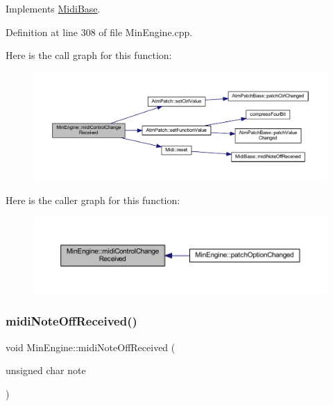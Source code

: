 Implements \hyperlink{class_midi_base_a8364d72d525fd8a766a124ca3230a4c7}{Midi\+Base}.



Definition at line 308 of file Min\+Engine.\+cpp.

Here is the call graph for this function\+:
\nopagebreak
\begin{figure}[H]
\begin{center}
\leavevmode
\includegraphics[width=350pt]{class_min_engine_ad7404def0db3926e77c8828cab13cca9_cgraph}
\end{center}
\end{figure}
Here is the caller graph for this function\+:
\nopagebreak
\begin{figure}[H]
\begin{center}
\leavevmode
\includegraphics[width=350pt]{class_min_engine_ad7404def0db3926e77c8828cab13cca9_icgraph}
\end{center}
\end{figure}
\mbox{\label{class_min_engine_aaab036105fa3dce51cc8c8345f2edcfe}} 
\subsubsection{\texorpdfstring{midi\+Note\+Off\+Received()}{midiNoteOffReceived()}}
{\footnotesize\ttfamily void Min\+Engine\+::midi\+Note\+Off\+Received (\begin{DoxyParamCaption}\item[{unsigned char}]{note }\end{DoxyParamCaption})\hspace{0.3cm}{\ttfamily [virtual]}}



